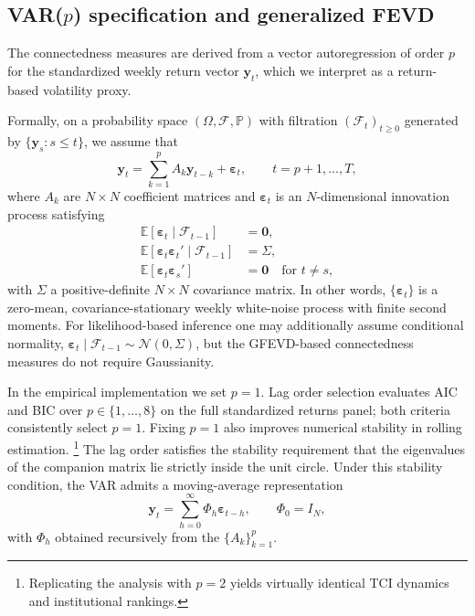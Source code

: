 \subsection{\texorpdfstring{VAR($p$)}{VAR(p)} specification and generalized FEVD}\label{subsec:var_gfevd}

The connectedness measures are derived from a vector autoregression of order $p$ for the
standardized weekly return vector $\mathbf{y}_t$, which we interpret as a return-based
volatility proxy.

Formally, on a probability space $(\Omega,\mathcal{F},\mathbb{P})$ with filtration
$(\mathcal{F}_t)_{t\geq 0}$ generated by $\{\mathbf{y}_s : s \le t\}$, we assume that
\begin{equation}
  \mathbf{y}_t
  = \sum_{k=1}^p A_k \mathbf{y}_{t-k} + \boldsymbol{\varepsilon}_t,
  \qquad t = p+1,\dots,T,
  \label{eq:varp}
\end{equation}
where $A_k$ are $N \times N$ coefficient matrices and $\boldsymbol{\varepsilon}_t$ is an
$N$-dimensional innovation process satisfying
\begin{align}
  \mathbb{E}[\boldsymbol{\varepsilon}_t \mid \mathcal{F}_{t-1}] &= \mathbf{0}, \\
  \mathbb{E}[\boldsymbol{\varepsilon}_t \boldsymbol{\varepsilon}_t' \mid \mathcal{F}_{t-1}] &= \Sigma, \\
  \mathbb{E}[\boldsymbol{\varepsilon}_t \boldsymbol{\varepsilon}_s'] &= \mathbf{0}
    \quad \text{for } t \neq s,
\end{align}
with $\Sigma$ a positive-definite $N \times N$ covariance matrix. In other words,
$\{\boldsymbol{\varepsilon}_t\}$ is a zero-mean, covariance-stationary weekly white-noise
process with finite second moments. For likelihood-based inference one may additionally
assume conditional normality, $\boldsymbol{\varepsilon}_t \mid \mathcal{F}_{t-1} \sim
\mathcal{N}(0,\Sigma)$, but the GFEVD-based connectedness measures do not require
Gaussianity.

In the empirical implementation we set $p = 1$. Lag order selection evaluates AIC and BIC
over $p \in \{1,\dots,8\}$ on the full standardized returns panel; both criteria
consistently select $p = 1$. Fixing $p = 1$ also improves numerical stability in rolling
estimation.%
\footnote{Replicating the analysis with $p = 2$ yields virtually identical TCI dynamics
and institutional rankings.}
The lag order satisfies the stability requirement that the eigenvalues of the companion
matrix lie strictly inside the unit circle. Under this stability condition, the VAR admits a
moving-average representation
\begin{equation}
  \mathbf{y}_t = \sum_{h=0}^{\infty} \Phi_h \boldsymbol{\varepsilon}_{t-h},
  \qquad \Phi_0 = I_N,
\end{equation}
with $\Phi_h$ obtained recursively from the $\{A_k\}_{k=1}^p$.

